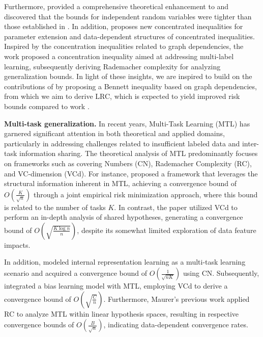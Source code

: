 \documentclass{article}
\begin{document}
Furthermore, \cite{ruiray22} provided a comprehensive theoretical enhancement to \cite{zhang19mcdiarmid} and discovered that the bounds for independent random variables were tighter than those established in \cite{jason04}. In addition, \cite{combes2024extension,tanoue2024concentration} proposes new concentrated inequalities for parameter extension and data-dependent structures of concentrated inequalities. Inspired by the concentration inequalities related to graph dependencies, the work \cite{wu2023macro-auc} proposed a concentration inequality aimed at addressing multi-label learning, subsequently deriving Rademacher complexity for analyzing generalization bounds. In light of these insights, we are inspired to build on the contributions of \cite{usunier2005generalization,ralaivola2015entropy,wu2023macro-auc} by proposing a Bennett inequality based on graph dependencies, from which we aim to derive LRC, which is expected to yield improved risk bounds compared to work  \cite{wu2023macro-auc}.

\textbf{Multi-task generalization.} 
In recent years, Multi-Task Learning (MTL) \cite{zhang2021survey} has garnered significant attention in both theoretical and applied domains, particularly in addressing challenges related to insufficient labeled data and inter-task information sharing. The theoretical analysis of MTL predominantly focuses on frameworks such as covering Numbers (CN), Rademacher Complexity (RC), and VC-dimension (VCd). For instance, \cite{ando05unableddata} proposed a framework that leverages the structural information inherent in MTL, achieving a convergence bound of $O(\frac{K}{\sqrt{n}})$ through a joint empirical risk minimization approach, where this bound is related to the number of tasks $K$. In contrast, the paper \cite{crammer12sharedhypothesis} utilized VCd to perform an in-depth analysis of shared hypotheses, generating a convergence bound of $O(\sqrt{\frac{K \log n}{n}})$, despite its somewhat limited exploration of data feature impacts.

In addition, \cite{baxter95} modeled internal representation learning as a multi-task learning scenario and acquired a convergence bound of $O(\frac{1}{\sqrt{n K}})$ using CN. Subsequently, \cite{baxter00} integrated a bias learning model with MTL, employing VCd to derive a convergence bound of $O(\sqrt{\frac{C}{n}})$. Furthermore, Maurer's previous work \cite{maurer06linear,maurer06rade}
applied RC to analyze MTL within linear hypothesis spaces, resulting in respective convergence bounds of $O(\frac{B}{\sqrt{n}})$, indicating data-dependent convergence rates.
\end{document}

